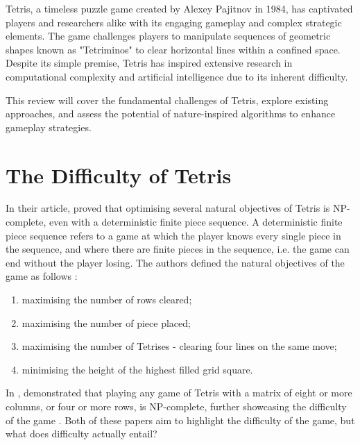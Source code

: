 \documentclass[a4paper, 12pt]{extreport}
\begin{document}
		
		Tetris, a timeless puzzle game created by Alexey Pajitnov in 1984, has captivated players and researchers alike with its engaging gameplay and complex strategic elements. The game challenges players to manipulate sequences of geometric shapes known as "Tetriminos" to clear horizontal lines within a confined space. Despite its simple premise, Tetris has inspired extensive research in computational complexity and artificial intelligence due to its inherent difficulty.
		
		This review will cover the fundamental challenges of Tetris, explore existing approaches, and assess the potential of nature-inspired algorithms to enhance gameplay strategies.	
				
		\section{The Difficulty of Tetris} \label{sec:diff-of-tetris}
		
			In their article, \citeauthor{tetris-is-hard-even-to-approx} \cite{tetris-is-hard-even-to-approx} proved that optimising several natural objectives of Tetris is NP-complete, even with a deterministic finite piece sequence. A deterministic finite piece sequence refers to a game at which the player knows every single piece in the sequence, and where there are finite pieces in the sequence, i.e. the game can end without the player losing. The authors defined the natural objectives of the game as follows \cite{tetris-is-hard-even-to-approx}:
			
			\begin{enumerate}
				\item maximising the number of rows cleared;
				\item maximising the number of piece placed;
				\item maximising the number of Tetrises - clearing four lines on the same move;
				\item minimising the height of the highest filled grid square.
			\end{enumerate}
			
			In \citeyear{tetris-o1-np-hard}, \citeauthor{tetris-o1-np-hard} \cite{tetris-o1-np-hard} demonstrated that playing any game of Tetris with a matrix of eight or more columns, or four or more rows, is NP-complete, further showcasing the difficulty of the game . Both of these papers aim to highlight the difficulty of the game, but what does difficulty actually entail?
			
\end{document}
